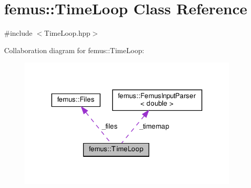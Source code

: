 \hypertarget{classfemus_1_1_time_loop}{}\section{femus\+:\+:Time\+Loop Class Reference}
\label{classfemus_1_1_time_loop}


{\ttfamily \#include $<$Time\+Loop.\+hpp$>$}



Collaboration diagram for femus\+:\+:Time\+Loop\+:
\nopagebreak
\begin{figure}[H]
\begin{center}
\leavevmode
\includegraphics[width=300pt]{classfemus_1_1_time_loop__coll__graph}
\end{center}
\end{figure}
